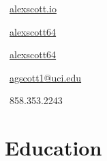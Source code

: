 \documentclass[letterpaper]{deedy-resume} %
\begin{document}
\begin{minipage}[t]{0.33\textwidth} %


%

\vspace{3mm}
{\color{RoyalBlue} \Large \faGlobe} \, \color{black}\href{https://alexscott.io}{alexscott.io} 
\vspace{1mm}

{\color{RoyalBlue} \Large \faLinkedin} \, \href{http://linkedin.com/in/alexscott64}{alexscott64} 
\vspace{1mm}

{\color{RoyalBlue} \Large \faGithub} \, \href{http://github.com/alexscott64}{alexscott64} 
\vspace{1mm}

{\color{RoyalBlue} \Large \faEnvelopeO} \, \href{mailto:agscott1@uci.edu}{agscott1@uci.edu} 
\vspace{1mm}

{\color{RoyalBlue} \Large \faPhone} \, 858.353.2243
\vspace{1mm}


\section{Education} 


\vspace{1mm}


\end{minipage}
\end{document}
